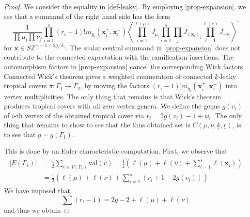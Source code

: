 \documentclass[10pt,a4paper,oneside,no-math,reqno]{amsart}%
\theoremstyle{plain}
\theoremstyle{definition}
\theoremstyle{remark}
\numberwithin{equation}{section}
\newcommand{\1}{\mathds{1}}
\newcommand{\<}{\langle}
\renewcommand{\>}{\rangle}
\begin{document}
\begin{proof}
    We consider the equality in \cref{def-leaky}. By employing \cref{prop-expansion}, we see that a summand of the right hand side has the form
    \begin{equation}
        \frac{1}{\prod\mu_i\prod\nu_j}\prod_{i=1}^s (r_i-1)! m_{g_i}(\textbf{x}^+_i,\textbf{x}^-_i)\left\langle \prod_{i=1}^{\ell(\mu)} J_{\mu_i}\prod_{i=1}^s\prod_j  J_{(\textbf{x}_i)_j}\prod_{l=1}^{\ell(\nu)} J_{-\nu_j}\right\rangle^\circ
    \end{equation}
    for $\textbf{x}\in S\mathbb{Z}^{r_i+1-2g_i;k_i}$. The scalar central summand in \cref{prop-expansion} does not contribute to the connected expectation with the ramification insertions. The automorphism factors in \cref{prop-expansion} cancel the corresponding Wick factors. Connected Wick's theorem gives a weighted enumeration of connected $\underline{k}$-leaky tropical covers $\pi\colon\Gamma_1\to\Gamma_2$, by moving the factors $(r_i-1)! m_{g_i}(\textbf{x}^+_i,\textbf{x}^-_i)$ into vertex multiplicities. The only thing that remains is that Wick's theorem produces tropical covers with all zero vertex genera. We define the genus $g(v_i)$ of $i$-th vertex of the obtained tropical cover via $r_i=2g(v_i)-1+w_i$. The only thing that remains to show to see that the thus obtained set is $C(\mu,\nu,\underline{k},\underline{r})$, is to see that $g=g(\Gamma_1)$.

    This is done by an Euler characteristic computation. First, we observe that
    \begin{align}
    \begin{split}
        |E(\Gamma_1)|&=\frac{1}{2}\sum_{v\in V(\Gamma_1)}\mathrm{val}(v)=\frac{1}{2}(\ell(\mu)+\ell(\nu)+\sum_{i=1}^s\ell(\textbf{x}_i))\\
        &=\frac{1}{2}(\ell(\mu)+\ell(\nu)+\sum_{i=1}^s(r_i+1-2g(v_i)))
    \end{split}
    \end{align}
    We have imposed that
    \begin{equation}
        \sum (r_i - 1)
        =
        2g-2+\ell(\mu)+\ell(\nu)
    \end{equation}
    and thus we obtain


\end{proof}
\end{document}
